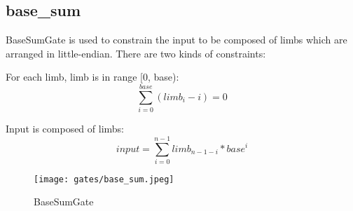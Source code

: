 \subsection{base\_sum}

BaseSumGate is used to constrain the input to be composed of limbs which are arranged in little-endian. There are two kinds of constraints:

For each limb, limb is in range [0, base):
\[\sum_{i=0}^{base}(limb_i - i) = 0\]

Input is composed of limbs:
\[input = \sum_{i=0}^{n-1} limb_{n-1-i} * base^i\]

\begin{figure}[!ht]
    \centering
    \texttt{[image: gates/base\_sum.jpeg]}
    \caption{BaseSumGate}
    \label{fig:base-sum}
\end{figure}